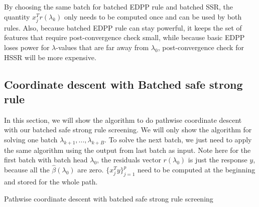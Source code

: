 \documentclass{article}
\begin{document}
By choosing the same batch for batched EDPP rule and batched SSR, the quantity $x_j^Tr(\lambda_k)$ only needs to be computed once and can be used by both rules. Also, because batched EDPP rule can stay powerful, it keeps the set of features that require post-convergence check small, while because basic EDPP loses power for $\lambda$-values that are far away from $\lambda_0$, post-convergence check for HSSR will be more expensive.

\subsection{Coordinate descent with Batched safe strong rule}

In this section, we will show the algorithm to do pathwise coordinate descent with our batched safe strong rule screening. We will only show the algorithm for solving one batch $\lambda_{k+1},...,\lambda_{k+B}$. To solve the next batch, we just need to apply the same algorithm using the output from last batch as input. Note here for the first batch with batch head $\lambda_0$, the residuals vector $r(\lambda_0)$ is just the response $y$, because all the $\hat{\beta}(\lambda_0)$ are zero. $\{x_j^Ty\}_{j=1}^p$ need to be computed at the beginning and stored for the whole path.

\begin{algorithm}[H]
    \SetAlgoLined
    \BlankLine
    \caption{Pathwise coordinate descent with batched safe strong rule screening}
\end{algorithm}
\end{document}
